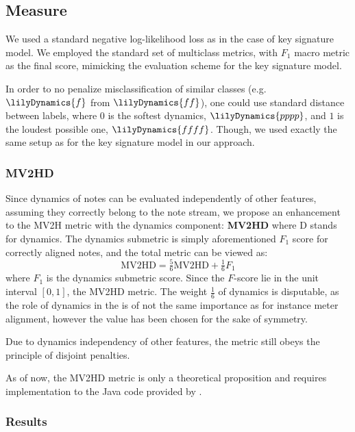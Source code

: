 \subsection{Measure}

We used a standard negative log-likelihood loss as in the case of key signature model. We employed the standard set of multiclass metrics, with $F_1$ macro metric as the final score, mimicking the evaluation scheme for the key signature model.

In order to no penalize misclassification of similar classes (e.g. $\lilyDynamics{f}$ from $\lilyDynamics{ff}$), one could use standard distance between labels, where $0$ is the softest dynamics, $\lilyDynamics{pppp}$, and $1$ is the loudest possible one, $\lilyDynamics{ffff}$. Though, we used exactly the same setup as for the key signature model in our approach.

\subsubsection{MV2HD}

Since dynamics of notes can be evaluated independently of other features, assuming they correctly belong to the note stream, we propose an enhancement to the MV2H metric with the dynamics component: \textbf{MV2HD} where D stands for dynamics. The dynamics submetric is simply aforementioned $F_1$ score for correctly aligned notes, and the total metric can be viewed as: \[\textrm{MV2HD} = \tfrac{5}{6}\textrm{MV2HD} + \tfrac{1}{6}F_1\] where $F_1$ is the dynamics submetric score. Since the $F$-score lie in the unit interval $[0, 1]$, the MV2HD metric. The weight $\tfrac{1}{6}$ of dynamics is disputable, as the role of dynamics in the is of not the same importance as for instance meter alignment, however the value has been chosen for the sake of symmetry.

Due to dynamics independency of other features, the metric still obeys the principle of disjoint penalties.

As of now, the MV2HD metric is only a theoretical proposition and requires implementation to the Java code provided by \cite{McLeod2019}.

\subsubsection{Results}

\missing